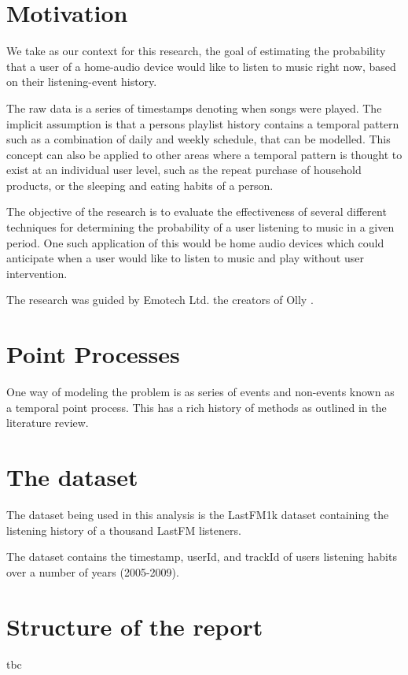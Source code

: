 \section{Motivation}

We take as our context for this research, the goal of estimating the probability that a user of a home-audio device would like to listen to music right now, based on their listening-event history. 

The raw data is a series of timestamps denoting when songs were played. The implicit assumption is that a persons playlist history contains a temporal pattern such as a combination of daily and weekly schedule, that can be modelled. This concept can also be applied to other areas where a temporal pattern is thought to exist at an individual user level, such as the repeat purchase of household products, or the sleeping and eating habits of a person.

The objective of the research is to evaluate the effectiveness of several different techniques for determining the probability of a user listening to music in a given period. One such application of this would be home audio devices which could anticipate when a user would like to listen to music and play without user intervention.

The research was guided by Emotech Ltd. the creators of Olly \parencite{Olly}.

\section{Point Processes}

One way of modeling the problem is as series of events and non-events known as a temporal point process. This has a rich history of methods as outlined in the literature review. 


\section{The dataset}
The dataset being used in this analysis is the LastFM1k dataset containing the listening history of a thousand LastFM listeners.

The dataset contains the timestamp, userId, and trackId of users listening habits over a number of years (2005-2009).

\section{Structure of the report}
tbc
